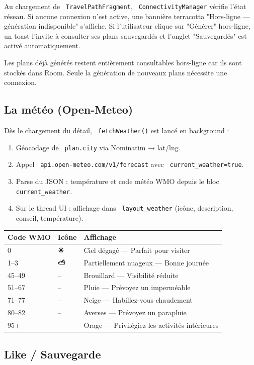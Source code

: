 \documentclass[a4paper,12pt,openany]{report}
\newcommand{\ic}[1]{\texttt{\small\colorbox{lightbg}{\color{navy!90} #1}}}
\begin{document}
Au chargement de \ic{TravelPathFragment}, \ic{ConnectivityManager} vérifie
l'état réseau. Si aucune connexion n'est active, une bannière terracotta
"Hors-ligne — génération indisponible" s'affiche. Si l'utilisateur clique
sur "Générer" hors-ligne, un toast l'invite à consulter ses plans sauvegardés
et l'onglet "Sauvegardés" est activé automatiquement.

Les plans déjà générés restent entièrement consultables hors-ligne car ils sont
stockés dans Room. Seule la génération de nouveaux plans nécessite une connexion.

\subsection{La météo (Open-Meteo)}

Dès le chargement du détail, \ic{fetchWeather()} est lancé en background :
\begin{enumerate}
  \item Géocodage de \ic{plan.city} via Nominatim → lat/lng.
  \item Appel \ic{api.open-meteo.com/v1/forecast} avec \ic{current\_weather=true}.
  \item Parse du JSON : température et code météo WMO depuis le bloc \ic{current\_weather}.
  \item Sur le thread UI : affichage dans \ic{layout\_weather} (icône,
    description, conseil, température).
\end{enumerate}

\begin{tabularx}{\textwidth}{l l X}
  \toprule
  Code WMO & Icône & Affichage \\
  \midrule
  0     & \textbf{☀}  & Ciel dégagé — Parfait pour visiter \\
  1--3  & \textbf{⛅}  & Partiellement nuageux — Bonne journée \\
  45--49 & --          & Brouillard — Visibilité réduite \\
  51--67 & --          & Pluie — Prévoyez un imperméable \\
  71--77 & --          & Neige — Habillez-vous chaudement \\
  80--82 & --          & Averses — Prévoyez un parapluie \\
  95+   & --           & Orage — Privilégiez les activités intérieures \\
  \bottomrule
\end{tabularx}

\subsection{Like / Sauvegarde}
\end{document}
